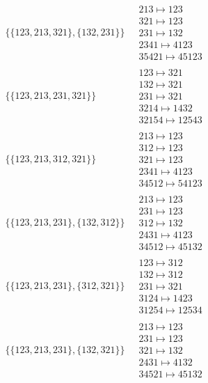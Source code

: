\begin{scriptsize}
\begin{align}
\begin{matrix}
\end{matrix}
\\
\{\{123, 213, 321\}, \{132, 231\}\}
\ 
&
\begin{matrix}
213 \mapsto 123\\321 \mapsto 123\\231 \mapsto 132\\2341 \mapsto 4123\\35421 \mapsto 45123
\end{matrix}
\\
\{\{123, 213, 231, 321\}\}
\ 
&
\begin{matrix}
123 \mapsto 321\\132 \mapsto 321\\231 \mapsto 321\\3214 \mapsto 1432\\32154 \mapsto 12543
\end{matrix}
\\
\{\{123, 213, 312, 321\}\}
\ 
&
\begin{matrix}
213 \mapsto 123\\312 \mapsto 123\\321 \mapsto 123\\2341 \mapsto 4123\\34512 \mapsto 54123
\end{matrix}
\\
\{\{123, 213, 231\}, \{132, 312\}\}
\ 
&
\begin{matrix}
213 \mapsto 123\\231 \mapsto 123\\312 \mapsto 132\\2431 \mapsto 4123\\34512 \mapsto 45132
\end{matrix}
\\
\{\{123, 213, 231\}, \{312, 321\}\}
\ 
&
\begin{matrix}
123 \mapsto 312\\132 \mapsto 312\\231 \mapsto 321\\3124 \mapsto 1423\\31254 \mapsto 12534
\end{matrix}
\\
\{\{123, 213, 231\}, \{132, 321\}\}
\ 
&
\begin{matrix}
213 \mapsto 123\\231 \mapsto 123\\321 \mapsto 132\\2431 \mapsto 4132\\34521 \mapsto 45132

\end{matrix}
\end{align}
\end{scriptsize}
